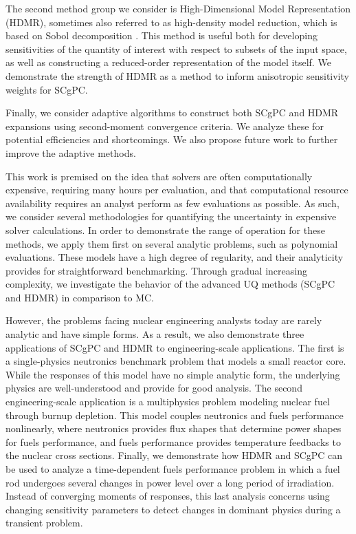 The second method group we consider is High-Dimensional Model Representation (HDMR), sometimes also referred
to as high-density model reduction, which is based on Sobol
decomposition \cite{hdmr}.  This method is useful both for developing sensitivities of the quantity of
interest with respect to subsets
of the input space, as well as constructing a reduced-order representation of the model itself.  We demonstrate the strength of HDMR
as a method to inform anisotropic sensitivity weights for SCgPC.

Finally, we consider adaptive algorithms to construct both SCgPC and HDMR expansions using second-moment
convergence criteria.  We analyze these for potential efficiencies and shortcomings.  We also propose future
work to further improve the adaptive methods.

This work is premised on the idea that solvers are often computationally expensive, requiring many hours per
evaluation, and that
computational resource availability requires an analyst perform as few evaluations as possible.  As such, 
we consider several methodologies for quantifying the uncertainty in expensive solver
calculations.  In order to demonstrate the range of operation for these methods, we apply them first on
several analytic problems, such as polynomial evaluations.  These models have a high
degree of regularity, and their analyticity provides for straightforward benchmarking.  Through gradual
increasing complexity, we investigate the behavior of the advanced UQ methods (SCgPC and HDMR) in comparison to MC.

However, the problems facing nuclear engineering analysts today are rarely analytic and have simple forms.  As
a result, we also demonstrate three applications of SCgPC and HDMR to engineering-scale applications.  The
first is a single-physics neutronics benchmark problem that models a small reactor core.  
While the responses of this model have no simple
analytic form, the underlying physics are well-understood and provide for good analysis.
The second
engineering-scale application is a multiphysics problem modeling nuclear fuel through burnup depletion.  This
model couples neutronics and fuels performance nonlinearly, where neutronics provides flux shapes that
determine power shapes for fuels performance, and fuels performance provides temperature feedbacks to the
nuclear cross sections.
Finally, we demonstrate how HDMR and SCgPC can be used to analyze a time-dependent fuels performance problem
in which a fuel rod undergoes several changes in power level over a long period of irradiation.  Instead of
converging moments of responses, this last analysis concerns using changing sensitivity parameters to detect
changes in dominant physics during a transient problem.

